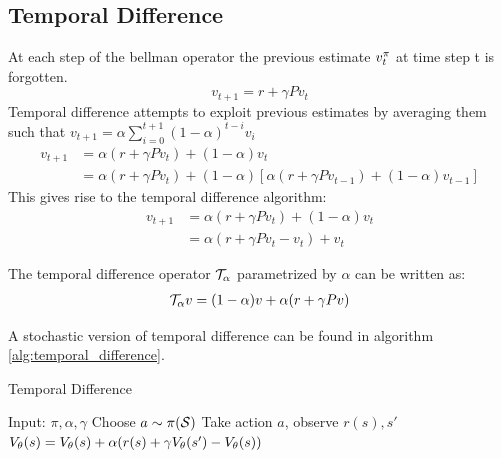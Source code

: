 \subsection{Temporal Difference}
At each step of the bellman operator the previous estimate $v^{\pi}_t$ at time step t is forgotten.
\begin{equation}
    v_{t+1} = r + \gamma P v_{t}
\end{equation}
Temporal difference attempts to exploit previous estimates by averaging them such that $v_{t+1} = \alpha \sum_{i=0}^{t+1} (1-\alpha)^{t-i} v_i$
\begin{equation}
\begin{split}
    v_{t+1} &= \alpha  (r + \gamma P v_{t}) + (1-\alpha) v_{t} \\
    &= \alpha  (r + \gamma P v_{t}) + (1-\alpha) [\alpha (r + \gamma P v_{t-1}) + (1-\alpha) v_{t-1}]
\end{split}
\end{equation}
This gives rise to the temporal difference algorithm:
\begin{equation}
\begin{split}
    v_{t+1} &= \alpha  (r + \gamma P v_{t}) + (1-\alpha) v_{t} \\
    &= \alpha (r + \gamma P v_{t} - v_{t}) + v_{t}
\end{split}
\end{equation}
\begin{definition}
The temporal difference operator $\mathcal{T}_{\alpha}$ parametrized by $\alpha$ can be written as:
\begin{equation}
\begin{split}
    \mathcal{T}_{\alpha} v &= (1-\alpha)v + \alpha(r + \gamma Pv) \\
\end{split}
\end{equation}
\end{definition}

A stochastic version of temporal difference can be found in algorithm \ref{alg:temporal_difference}.\\
\begin{algorithm}[H]
\caption{Temporal Difference}
\begin{algorithmic}[1]
    \STATE Input: $\pi,\alpha,\gamma$
        \STATE Choose $a \sim \pi(\mathcal{S})$
        \STATE Take action $a$, observe $r(s),s'$
        \STATE $V_{\theta}(s) = V_{\theta}(s) + \alpha (r(s) + \gamma V_{\theta}(s')-V_{\theta}(s)) $
    \ENDFOR
\end{algorithmic}
\label{alg:temporal_difference}
\end{algorithm}

